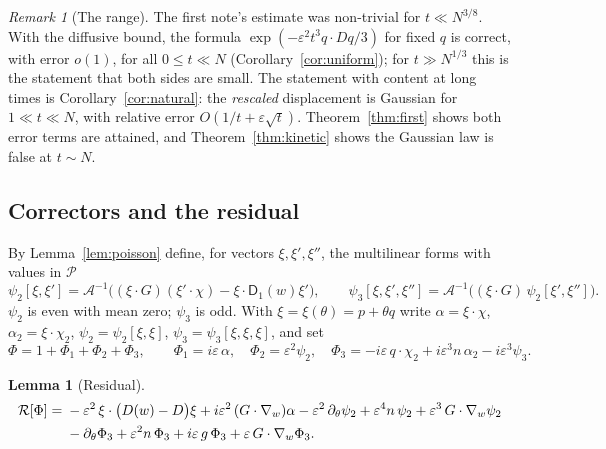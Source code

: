 \documentclass[11pt]{article}
\newcommand{\eps}{\varepsilon}
\newcommand{\cA}{\mathcal{A}}
\newcommand{\cR}{\mathcal{R}}
\newcommand{\cP}{\mathcal{P}}
\newcommand{\sD}{\mathsf{D}}
\newtheorem{lemma}[theorem]{Lemma}
\theoremstyle{remark}
\newtheorem{remark}[theorem]{Remark}
\begin{document}
\begin{remark}[The range]\label{rem:range}
The first note's estimate was non-trivial for $t\ll N^{3/8}$. With the
diffusive bound, the formula $\exp(-\eps^2t^3q\cdot Dq/3)$ for fixed $q$ is
correct, with error $o(1)$, for all $0\le t\ll N$
(Corollary~\ref{cor:uniform}); for $t\gg N^{1/3}$ this is the statement that
both sides are small. The statement with content at long times is
Corollary~\ref{cor:natural}: the \emph{rescaled} displacement is Gaussian for
$1\ll t\ll N$, with relative error $O(1/t + \eps\sqrt t)$.
Theorem~\ref{thm:first} shows both error terms are attained, and
Theorem~\ref{thm:kinetic} shows the Gaussian law is false at $t\sim N$.
\end{remark}

\subsection{Correctors and the residual}

By Lemma~\ref{lem:poisson} define, for vectors $\xi,\xi',\xi''$, the
multilinear forms with values in $\cP$
\[
  \psi_2[\xi,\xi'] = \cA^{-1}\bigl((\xi\cdot G)(\xi'\cdot\chi)
      - \xi\cdot\sD_1(w)\xi'\bigr),\qquad
  \psi_3[\xi,\xi',\xi''] = \cA^{-1}\bigl((\xi\cdot G)\,\psi_2[\xi',\xi'']\bigr).
\]
$\psi_2$ is even with mean zero; $\psi_3$ is odd. With
$\xi = \xi(\theta) = p+\theta q$ write $\alpha = \xi\cdot\chi$,
$\alpha_2 = \xi\cdot\chi_2$, $\psi_2 = \psi_2[\xi,\xi]$,
$\psi_3 = \psi_3[\xi,\xi,\xi]$, and set
\begin{equation}
  \Phi = 1 + \Phi_1 + \Phi_2 + \Phi_3,\qquad
  \Phi_1 = i\eps\,\alpha,\quad
  \Phi_2 = \eps^2\psi_2,\quad
  \Phi_3 = -i\eps\,q\cdot\chi_2 + i\eps^3n\,\alpha_2 - i\eps^3\psi_3 .
  \label{eq:Phi}
\end{equation}

\begin{lemma}[Residual]\label{lem:res}
\begin{align}
  \cR[\Phi] ={}& -\eps^2\,\xi\cdot\bigl(D(w)-D\bigr)\xi
     + i\eps^2\,(G\cdot\nabla_w)\alpha
     - \eps^2\,\partial_\theta\psi_2 + \eps^4n\,\psi_2
     + \eps^3\,G\cdot\nabla_w\psi_2 \notag\\
   & - \partial_\theta\Phi_3 + \eps^2n\,\Phi_3 + i\eps\,g\,\Phi_3
     + \eps\,G\cdot\nabla_w\Phi_3 .
  \label{eq:res}
\end{align}
\end{lemma}
\end{document}
